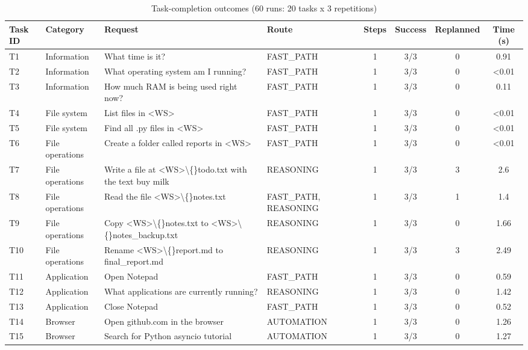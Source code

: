 \begin{table}[htbp]
\caption{Task-completion outcomes (60 runs: 20 tasks x 3 repetitions)}
\label{tab:tableVI_tasks}
\centering
\begin{tabular}{llp{3.2cm}lcccc}
\hline
\textbf{Task ID} & \textbf{Category} & \textbf{Request} & \textbf{Route} & \textbf{Steps} & \textbf{Success} & \textbf{Replanned} & \textbf{Time (s)} \\
\hline
T1 & Information & What time is it? & FAST\_PATH & 1 & 3/3 & 0 & 0.91 \\
T2 & Information & What operating system am I running? & FAST\_PATH & 1 & 3/3 & 0 & \textless{}0.01 \\
T3 & Information & How much RAM is being used right now? & FAST\_PATH & 1 & 3/3 & 0 & 0.11 \\
T4 & File system & List files in \textless{}WS\textgreater{} & FAST\_PATH & 1 & 3/3 & 0 & \textless{}0.01 \\
T5 & File system & Find all .py files in \textless{}WS\textgreater{} & FAST\_PATH & 1 & 3/3 & 0 & \textless{}0.01 \\
T6 & File operations & Create a folder called reports in \textless{}WS\textgreater{} & FAST\_PATH & 1 & 3/3 & 0 & \textless{}0.01 \\
T7 & File operations & Write a file at \textless{}WS\textgreater{}\textbackslash\{\}todo.txt with the text buy milk & REASONING & 1 & 3/3 & 3 & 2.6 \\
T8 & File operations & Read the file \textless{}WS\textgreater{}\textbackslash\{\}notes.txt & FAST\_PATH, REASONING & 1 & 3/3 & 1 & 1.4 \\
T9 & File operations & Copy \textless{}WS\textgreater{}\textbackslash\{\}notes.txt to \textless{}WS\textgreater{}\textbackslash\{\}notes\_backup.txt & REASONING & 1 & 3/3 & 0 & 1.66 \\
T10 & File operations & Rename \textless{}WS\textgreater{}\textbackslash\{\}report.md to final\_report.md & REASONING & 1 & 3/3 & 3 & 2.49 \\
T11 & Application & Open Notepad & FAST\_PATH & 1 & 3/3 & 0 & 0.59 \\
T12 & Application & What applications are currently running? & REASONING & 1 & 3/3 & 0 & 1.42 \\
T13 & Application & Close Notepad & FAST\_PATH & 1 & 3/3 & 0 & 0.52 \\
T14 & Browser & Open github.com in the browser & AUTOMATION & 1 & 3/3 & 0 & 1.26 \\
T15 & Browser & Search for Python asyncio tutorial & AUTOMATION & 1 & 3/3 & 0 & 1.27 \\

\end{tabular}
\end{table}
